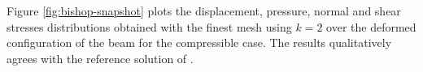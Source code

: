 \documentclass{wccm2024}
\begin{document}
Figure \ref{fig:bishop-snapshot} plots the displacement, pressure, normal and shear stresses distributions obtained with the finest mesh using $k=2$ over the deformed configuration of the beam for the compressible case. The results qualitatively agrees with the reference solution of \cite{bishop2014displacement}.

\begin{figure} [!htb]
    \centering
     \hfill
     \\
     \hfill

\end{figure}
\end{document}
